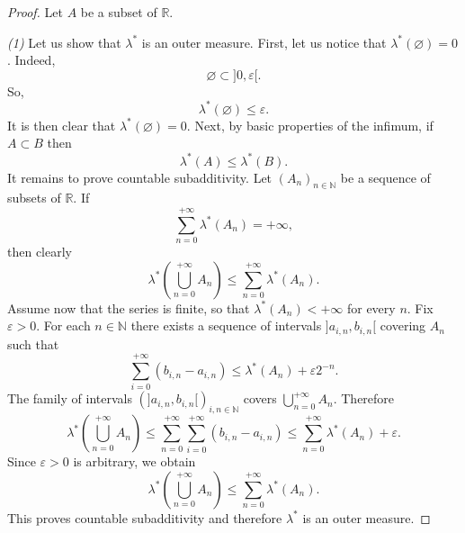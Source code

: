 \begin{proof}
	Let $A$ be a subset of $\mathbb{R}$.

	\emph{(1)} Let us show that $\lambda^*$ is an outer measure.
	First, let us notice that $\lambda^*(\varnothing)=0$. Indeed,
	\[
	\varnothing \subset ]0,\varepsilon [.
		\]
		So,
		\[
			\lambda^*(\varnothing) \le \varepsilon.
		\]
		It is then clear that $\lambda^*(\varnothing) = 0$.
		Next, by basic properties of the infimum, if $A \subset B$ then
		\[
			\lambda^*(A)\le \lambda^*(B).
		\]
		It remains to prove countable subadditivity.
		Let $(A_n)_{n\in\mathbb{N}}$ be a sequence of subsets of $\mathbb{R}$.
		If
		\[
			\sum_{n=0}^{+\infty}\lambda^*(A_n)=+\infty,
		\]
		then clearly
		\[
			\lambda^*\!\left(\bigcup_{n=0}^{+\infty}A_n\right)
			\le
			\sum_{n=0}^{+\infty}\lambda^*(A_n).
		\]
		Assume now that the series is finite, so that
		$\lambda^*(A_n)<+\infty$ for every $n$.
		Fix $\varepsilon>0$.
		For each $n\in\mathbb{N}$ there exists a sequence of intervals
		$]a_{i,n},b_{i,n}[$ covering $A_n$ such that
		\[
			\sum_{i=0}^{+\infty}(b_{i,n}-a_{i,n})
			\le
			\lambda^*(A_n)+\varepsilon 2^{-n}.
		\]
		The family of intervals $(]a_{i,n},b_{i,n}[)_{i,n\in\mathbb{N}}$
		covers $\displaystyle\bigcup_{n=0}^{+\infty}A_n$.
		Therefore
		\[
			\lambda^*\!\left(\bigcup_{n=0}^{+\infty}A_n\right)
			\le
			\sum_{n=0}^{+\infty}\sum_{i=0}^{+\infty}(b_{i,n}-a_{i,n})
			\le
			\sum_{n=0}^{+\infty}\lambda^*(A_n)+\varepsilon.
		\]
		Since $\varepsilon>0$ is arbitrary, we obtain
		\[
			\lambda^*\!\left(\bigcup_{n=0}^{+\infty}A_n\right)
			\le
			\sum_{n=0}^{+\infty}\lambda^*(A_n).
		\]
		This proves countable subadditivity and therefore $\lambda^*$ is an outer measure.

		\medskip


\end{proof}
